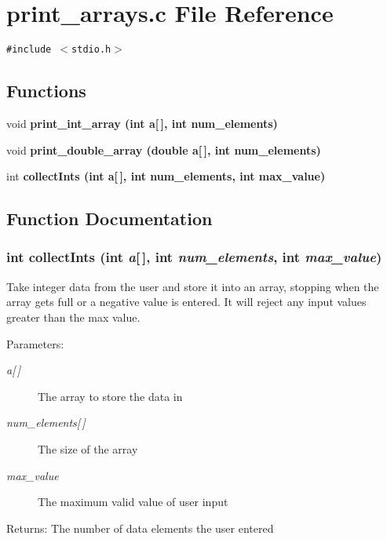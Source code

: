 \section{print\_\-arrays.c File Reference}
\label{print__arrays_8c}
{\tt \#include $<$stdio.h$>$}\par
\subsection*{Functions}
\begin{CompactItemize}
\item 
void \bf{print\_\-int\_\-array} (int a[$\,$], int num\_\-elements)
\item 
void \bf{print\_\-double\_\-array} (double a[$\,$], int num\_\-elements)
\item 
int \bf{collect\-Ints} (int a[$\,$], int num\_\-elements, int max\_\-value)
\end{CompactItemize}


\subsection{Function Documentation}
\subsubsection{\setlength{\rightskip}{0pt plus 5cm}int collect\-Ints (int {\em a}[$\,$], int {\em num\_\-elements}, int {\em max\_\-value})}\label{print__arrays_8c_3c48583ebe9f34d8bfee8a0f01243a48}


Take integer data from the user and store it into an array, stopping when the array gets full or a negative value is entered. It will reject any input values greater than the max value. \begin{Desc}
\item[Parameters:]
\begin{description}
\item[{\em a\mbox{[}$\,$\mbox{]}}]The array to store the data in \item[{\em num\_\-elements\mbox{[}$\,$\mbox{]}}]The size of the array \item[{\em max\_\-value}]The maximum valid value of user input \end{description}
\end{Desc}
\begin{Desc}
\item[Returns:]The number of data elements the user entered \end{Desc}
